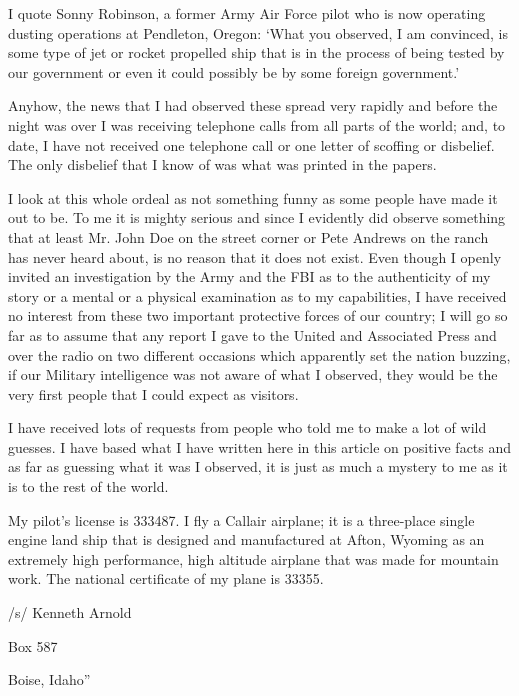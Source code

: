 \begin{svgraybox}
      I quote Sonny Robinson, a former Army Air Force pilot who is now operating dusting operations at Pendleton, Oregon: `What you observed, I am convinced, is some type of jet or rocket propelled ship that is in the process of being tested by our government or even it could possibly be by some foreign government.'

      Anyhow, the news that I had observed these spread very rapidly and before the night was over I was receiving telephone calls from all parts of the world; and, to date, I have not received one telephone call or one letter of scoffing or disbelief. The only disbelief that I know of was what was printed in the papers.

      I look at this whole ordeal as not something funny as some people have made it out to be. To me it is mighty serious and since I evidently did observe something that at least Mr. John Doe on the street corner or Pete Andrews on the ranch has never heard about, is no reason that it does not exist. Even though I openly invited an investigation by the Army and the
      FBI as to the authenticity of my story or a mental or a physical examination as to my capabilities, I have received no interest from these two important protective forces of our country; I will go so far as to assume that any report I gave to the United and Associated Press and over the radio on two different occasions which apparently set the nation buzzing, if our Military intelligence was not aware of what I observed, they would be the very first people that I could expect as visitors.

      I have received lots of requests from people who told me to make a lot of wild guesses. I have based what I have written here in this article on positive facts and as far as guessing what it was I observed, it is just as much a mystery to me as it is to the rest of the world.

      My pilot's license is 333487. I fly a Callair airplane; it is a three-place single engine land ship that is designed and manufactured at Afton, Wyoming as an extremely high performance, high altitude airplane that was made for mountain work. The national certificate of my plane is 33355.


/s/ Kenneth Arnold

Box 587

Boise, Idaho''
\end{svgraybox}

